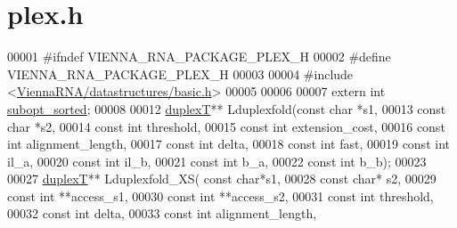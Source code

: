 \hypertarget{plex_8h_source}{}\section{plex.\+h}
\label{plex_8h_source}

\begin{DoxyCode}
00001 \textcolor{preprocessor}{#ifndef VIENNA\_RNA\_PACKAGE\_PLEX\_H}
00002 \textcolor{preprocessor}{#define VIENNA\_RNA\_PACKAGE\_PLEX\_H}
00003 
00004 \textcolor{preprocessor}{#include <\hyperlink{datastructures_2basic_8h}{ViennaRNA/datastructures/basic.h}>}
00005 
00006 
00007 \textcolor{keyword}{extern} \textcolor{keywordtype}{int} \hyperlink{group__subopt__wuchty_ga873cf8ed69e0437f8efa8b1fec854a0e}{subopt\_sorted};
00008 
00012 \hyperlink{group__data__structures_structduplexT}{duplexT}** Lduplexfold(\textcolor{keyword}{const} \textcolor{keywordtype}{char} *s1,
00013                       \textcolor{keyword}{const} \textcolor{keywordtype}{char} *s2,
00014                       \textcolor{keyword}{const} \textcolor{keywordtype}{int} threshold,
00015                       \textcolor{keyword}{const} \textcolor{keywordtype}{int} extension\_cost,
00016                       \textcolor{keyword}{const} \textcolor{keywordtype}{int} alignment\_length,
00017                       \textcolor{keyword}{const} \textcolor{keywordtype}{int} delta,
00018                       \textcolor{keyword}{const} \textcolor{keywordtype}{int} fast,
00019                       \textcolor{keyword}{const} \textcolor{keywordtype}{int} il\_a,
00020                       \textcolor{keyword}{const} \textcolor{keywordtype}{int} il\_b,
00021                       \textcolor{keyword}{const} \textcolor{keywordtype}{int} b\_a,
00022                       \textcolor{keyword}{const} \textcolor{keywordtype}{int} b\_b);
00023 
00027 \hyperlink{group__data__structures_structduplexT}{duplexT}** Lduplexfold\_XS( \textcolor{keyword}{const} \textcolor{keywordtype}{char}*s1,
00028                           \textcolor{keyword}{const} \textcolor{keywordtype}{char}* s2,
00029                           \textcolor{keyword}{const} \textcolor{keywordtype}{int} **access\_s1,
00030                           \textcolor{keyword}{const} \textcolor{keywordtype}{int} **access\_s2,
00031                           \textcolor{keyword}{const} \textcolor{keywordtype}{int} threshold,
00032                           \textcolor{keyword}{const} \textcolor{keywordtype}{int} delta,
00033                           \textcolor{keyword}{const} \textcolor{keywordtype}{int} alignment\_length,

\end{DoxyCode}
